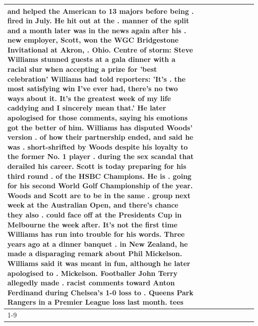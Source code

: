 \begin{table}[H]
\begin{tabular}{lllrlllll}
and helped the American to 13 majors before being . fired in July. He hit out at the . manner of the split and a month later was in the news again after his . new employer, Scott, won the WGC Bridgestone Invitational at Akron, . Ohio. Centre of storm: Steve Williams stunned guests at a gala dinner with a racial slur when accepting a prize for 'best celebration' Williams had told reporters: 'It's . the most satisfying win I've ever had, there's no two ways about it. It's the greatest week of my life caddying and I sincerely mean that.' He later apologised for those comments, saying his emotions got the better of him. Williams has disputed Woods' version . of how their partnership ended, and said he was . short-shrifted by Woods despite his loyalty to the former No. 1 player . during the sex scandal that derailed his career. Scott is today preparing for his third round . of the HSBC Champions. He is . going for his second World Golf Championship of the year. Woods and Scott are to be in the same . group next week at the Australian Open, and there's chance they also . could face off at the Presidents Cup in Melbourne the week after. It's not the first time Williams has run into trouble for his words. Three years ago at a dinner banquet . in New Zealand, he made a disparaging remark about Phil Mickelson. Williams said it was meant in fun, although he later apologised to . Mickelson. Footballer John Terry allegedly made . racist comments toward Anton Ferdinand during Chelsea's 1-0 loss to . Queens Park Rangers in a Premier League loss last month. tees \\
\cline{1-9}

\end{tabular}
\end{table}
